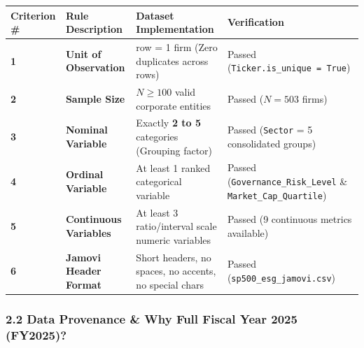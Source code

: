 \documentclass[
]{article}
\newcounter{none} %
\begin{document}
{\def\LTcaptype{none} %
\begin{longtable}[]{@{}
  >{\centering\arraybackslash}p{}
  >{\raggedright\arraybackslash}p{}
  >{\raggedright\arraybackslash}p{}
  >{\centering\arraybackslash}p{}@{}}
\toprule\noalign{}
\begin{minipage}[b]{\linewidth}\centering
Criterion \#
\end{minipage} & \begin{minipage}[b]{\linewidth}\raggedright
Rule Description
\end{minipage} & \begin{minipage}[b]{\linewidth}\raggedright
Dataset Implementation
\end{minipage} & \begin{minipage}[b]{\linewidth}\centering
Verification
\end{minipage} \\
\midrule\noalign{}
\endhead
\bottomrule\noalign{}
\endlastfoot
\textbf{1} & \textbf{Unit of Observation} & 1 row = 1 firm (Zero
duplicates across rows) & Passed
(\texttt{Ticker.is\_unique\ =\ True}) \\
\textbf{2} & \textbf{Sample Size} & \(N \ge 100\) valid corporate
entities & Passed (\(N = 503\) firms) \\
\textbf{3} & \textbf{Nominal Variable} & Exactly \textbf{2 to 5}
categories (Grouping factor) & Passed (\texttt{Sector} = 5 consolidated
groups) \\
\textbf{4} & \textbf{Ordinal Variable} & At least 1 ranked categorical
variable & Passed (\texttt{Governance\_Risk\_Level} \&
\texttt{Market\_Cap\_Quartile}) \\
\textbf{5} & \textbf{Continuous Variables} & At least 3 ratio/interval
scale numeric variables & Passed (9 continuous metrics available) \\
\textbf{6} & \textbf{Jamovi Header Format} & Short headers, no spaces,
no accents, no special chars & Passed
(\texttt{sp500\_esg\_jamovi.csv}) \\
\end{longtable}
}

\subsubsection{2.2 Data Provenance \& Why Full Fiscal Year 2025
(FY2025)?}\label{data-provenance-why-full-fiscal-year-2025-fy2025}
\end{document}
